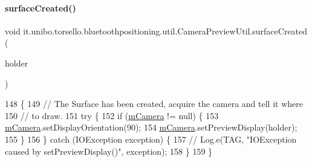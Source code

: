 \paragraph{\texorpdfstring{surface\+Created()}{surfaceCreated()}}
{\footnotesize\ttfamily void it.\+unibo.\+torsello.\+bluetoothpositioning.\+util.\+Camera\+Preview\+Util.\+surface\+Created (\begin{DoxyParamCaption}\item[{Surface\+Holder}]{holder }\end{DoxyParamCaption})}


\begin{DoxyCode}
148                                                      \{
149         \textcolor{comment}{// The Surface has been created, acquire the camera and tell it where}
150         \textcolor{comment}{// to draw.}
151         \textcolor{keywordflow}{try} \{
152             \textcolor{keywordflow}{if} (\hyperlink{classit_1_1unibo_1_1torsello_1_1bluetoothpositioning_1_1util_1_1CameraPreviewUtil_a7ee402da8ec64412f9a68e68b4025eea_a7ee402da8ec64412f9a68e68b4025eea}{mCamera} != null) \{
153                 \hyperlink{classit_1_1unibo_1_1torsello_1_1bluetoothpositioning_1_1util_1_1CameraPreviewUtil_a7ee402da8ec64412f9a68e68b4025eea_a7ee402da8ec64412f9a68e68b4025eea}{mCamera}.setDisplayOrientation(90);
154                 \hyperlink{classit_1_1unibo_1_1torsello_1_1bluetoothpositioning_1_1util_1_1CameraPreviewUtil_a7ee402da8ec64412f9a68e68b4025eea_a7ee402da8ec64412f9a68e68b4025eea}{mCamera}.setPreviewDisplay(holder);
155             \}
156         \} \textcolor{keywordflow}{catch} (IOException exception) \{
157 \textcolor{comment}{//            Log.e(TAG, "IOException caused by setPreviewDisplay()", exception);}
158         \}
159     \}
\end{DoxyCode}
\hypertarget{classit_1_1unibo_1_1torsello_1_1bluetoothpositioning_1_1util_1_1CameraPreviewUtil_ab5010e060d99e2808402b40555ba7c1a_ab5010e060d99e2808402b40555ba7c1a}{}\label{classit_1_1unibo_1_1torsello_1_1bluetoothpositioning_1_1util_1_1CameraPreviewUtil_ab5010e060d99e2808402b40555ba7c1a_ab5010e060d99e2808402b40555ba7c1a} 
